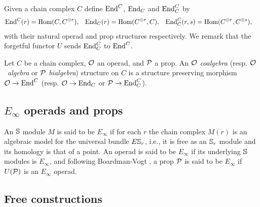 Given a chain complex $C$ define $\End^C$, $\End_C$ and $\End_C^C$ by
\begin{align*}
\End^C(r) &= \Hom(C, C^{\otimes r}),
& \End_C(r) &= \Hom(C^{\otimes r}, C),
& \End^C_C(r, s) &= \Hom(C^{\otimes r}, C^{\otimes s}),
\end{align*}
with their natural operad and prop structures respectively.
We remark that the forgetful functor $U$ sends $\End^C_C$ to $\End^C$.

Let $C$ be a chain complex, $\O$ an operad, and $\P$ a prop.
An $\O$ \textit{coalgebra} (resp. \mbox{$\O$ \textit{algebra}} or $\P$ \textit{bialgebra}) structure on $C$ is a structure preserving morphism $\O \to \End^C$ (resp. $\O \to \End_C$ or $\P \to \End_C^C$).

\subsection{$E_\infty$ operads and props}

An $\S$ module $M$ is said to be $E_\infty$ if for each $r$ the chain complex $M(r)$ is an algebraic model for the universal bundle $E\S_r$, i.e., it is free as an $\S_r$ module and its homology is that of a point.
An operad is said to be $E_\infty$ if its underlying $\S$ modules is $E_\infty$, and following Boardman-Vogt \cite{boardman2006homotopy}, a prop $\P$ is said to be $E_\infty$ if $U(\P)$ is an $E_\infty$ operad.

\subsection{Free constructions}

